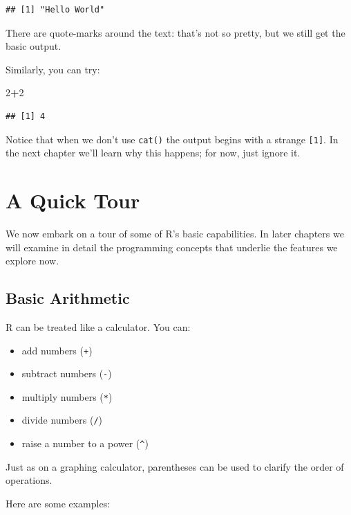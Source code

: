 \documentclass[]{book}
\makeatletter
\newenvironment{Shaded}{\begin{snugshade}}{\end{snugshade}}
\newcommand{\DecValTok}[1]{\textcolor[rgb]{0.00,0.00,0.81}{#1}}
\newcommand{\OperatorTok}[1]{\textcolor[rgb]{0.81,0.36,0.00}{\textbf{#1}}}
\providecommand{\tightlist}{%
  \setlength{\itemsep}{0pt}\setlength{\parskip}{0pt}}
\newenvironment{kframe}{%
\medskip{}
\setlength{\fboxsep}{.8em}
 \def\at@end@of@kframe{}%
 \ifinner\ifhmode%
  \def\at@end@of@kframe{\end{minipage}}%
  \begin{minipage}{\columnwidth}%
 \fi\fi%
 \def\FrameCommand##1{\hskip\@totalleftmargin \hskip-\fboxsep
 \colorbox{shadecolor}{##1}\hskip-\fboxsep
     \hskip-\linewidth \hskip-\@totalleftmargin \hskip\columnwidth}%
 \MakeFramed {\advance\hsize-\width
   \@totalleftmargin\z@ \linewidth\hsize
   \@setminipage}}%
 {\par\unskip\endMakeFramed%
 \at@end@of@kframe}
\renewenvironment{Shaded}{\begin{kframe}}{\end{kframe}}
\theoremstyle{definition}
\theoremstyle{definition}
\theoremstyle{definition}
\theoremstyle{remark}
\makeatother
\begin{document}
\begin{verbatim}
## [1] "Hello World"
\end{verbatim}

There are quote-marks around the text: that's not so pretty, but we
still get the basic output.

Similarly, you can try:

\begin{Shaded}
\begin{Highlighting}[]
\DecValTok{2}\OperatorTok{+}\DecValTok{2}
\end{Highlighting}
\end{Shaded}

\begin{verbatim}
## [1] 4
\end{verbatim}

Notice that when we don't use \texttt{cat()} the output begins with a
strange \texttt{{[}1{]}}. In the next chapter we'll learn why this
happens; for now, just ignore it.

\section{A Quick Tour}\label{idea-tour}

We now embark on a tour of some of R's basic capabilities. In later
chapters we will examine in detail the programming concepts that
underlie the features we explore now.

\subsection{Basic Arithmetic}\label{idea-arithmetic}

R can be treated like a calculator. You can:

\begin{itemize}
\tightlist
\item
  add numbers (\texttt{+})
\item
  subtract numbers (\texttt{-})
\item
  multiply numbers (\texttt{*})
\item
  divide numbers (\texttt{/})
\item
  raise a number to a power (\texttt{\^{}})
\end{itemize}

Just as on a graphing calculator, parentheses can be used to clarify the
order of operations.

Here are some examples:
\end{document}
